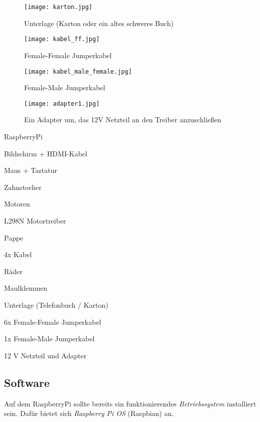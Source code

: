 \begin{figure}[H]
\centering
\parbox{5cm}{
\texttt{[image: karton.jpg]}
\caption*{Unterlage (Karton oder ein altes schweres Buch)}
}
\qquad
\begin{minipage}{5cm}
\texttt{[image: kabel\_ff.jpg]}
\caption*{Female-Female Jumperkabel}
\end{minipage}
\end{figure}

\begin{figure}[H]
\centering
\parbox{5cm}{
\texttt{[image: kabel\_male\_female.jpg]}
\caption*{Female-Male Jumperkabel}
}
\qquad
\begin{minipage}{5cm}
\texttt{[image: adapter1.jpg]}
\caption*{Ein Adapter um, das 12V Netzteil an den Treiber anzuschließen}
\end{minipage}
\end{figure}


\begin{checklist}
    \item RaspberryPi
    \item Bildschirm + HDMI-Kabel
    \item Maus + Tastatur
    \item Zahnstocher
    \item Motoren
    \item L298N Motortreiber
    \item Pappe
    \item 4x Kabel
    \item Räder
    \item Maulklemmen
    \item Unterlage (Telefonbuch / Karton)
    \item 6x Female-Female Jumperkabel
    \item 1x Female-Male Jumperkabel
    \item 12 V Netzteil und Adapter
\end{checklist}


\subsection{Software}
Auf dem RaspberryPi sollte bereits ein funktionierendes \emph{Betriebssystem} installiert sein. Dafür bietet sich \emph{Raspberry Pi OS} (Raspbian) an. \\

